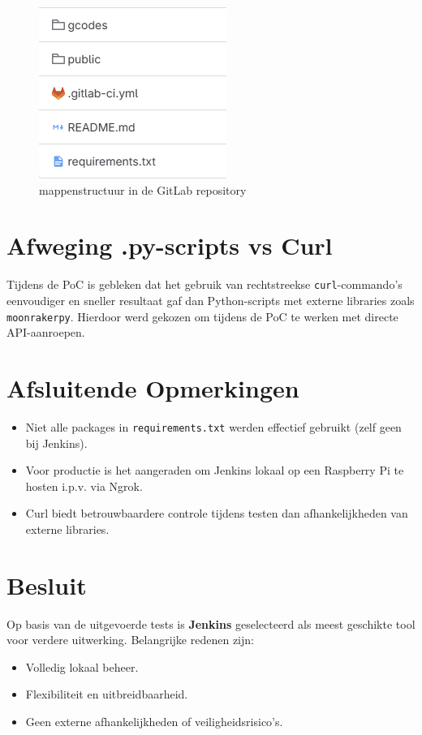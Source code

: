 \begin{enumerate}
\begin{figure}[H]
    \centering
    \includegraphics[width=0.3\linewidth]{foto's/Gitlab/folder.png}
    \caption{mappenstructuur in de GitLab repository}
    \label{fig:GitLab_Repo}
\end{figure}

\section{Afweging .py-scripts vs Curl}
Tijdens de PoC is gebleken dat het gebruik van rechtstreekse \texttt{curl}-commando’s eenvoudiger en sneller resultaat gaf dan Python-scripts met externe libraries zoals \texttt{moonrakerpy}. Hierdoor werd gekozen om tijdens de PoC te werken met directe API-aanroepen.

\section{Afsluitende Opmerkingen}
\begin{itemize}
    \item Niet alle packages in \texttt{requirements.txt} werden effectief gebruikt (zelf geen bij Jenkins).
    \item Voor productie is het aangeraden om Jenkins lokaal op een Raspberry Pi te hosten i.p.v. via Ngrok.
    \item Curl biedt betrouwbaardere controle tijdens testen dan afhankelijkheden van externe libraries.
\end{itemize}

\section{Besluit}
Op basis van de uitgevoerde tests is \textbf{Jenkins} geselecteerd als meest geschikte tool voor verdere uitwerking. Belangrijke redenen zijn:
\begin{itemize}
    \item Volledig lokaal beheer.
    \item Flexibiliteit en uitbreidbaarheid.
    \item Geen externe afhankelijkheden of veiligheidsrisico’s.
\end{itemize}


\end{enumerate}
